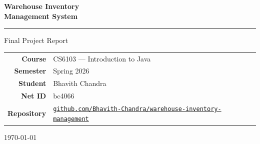 \documentclass[12pt,a4paper]{article}
\begin{document}
\begin{titlepage}
  \centering
  \vspace*{2cm}

  {\Huge\bfseries\color{navyblue} Warehouse Inventory\\[6pt] Management System\par}
  \vspace{0.4cm}
  {\large\color{accentblue}\rule{0.6\linewidth}{1.5pt}\par}
  \vspace{0.4cm}
  {\large\color{midgray} Final Project Report\par}

  \vspace{2.5cm}

  \begin{center}
    \begin{tabular}{rl}
      \textbf{Course}    & CS6103 --- Introduction to Java \\[4pt]
      \textbf{Semester}  & Spring 2026 \\[4pt]
      \textbf{Student}   & Bhavith Chandra \\[4pt]
      \textbf{Net ID}    & bc4066 \\[4pt]
      \textbf{Repository}& \href{https://github.com/Bhavith-Chandra/warehouse-inventory-management}%
                              {\texttt{github.com/Bhavith-Chandra/warehouse-inventory-management}}
    \end{tabular}
  \end{center}

  \vfill
  {\small\color{midgray}\today}
\end{titlepage}

\tableofcontents
\newpage
\end{document}
